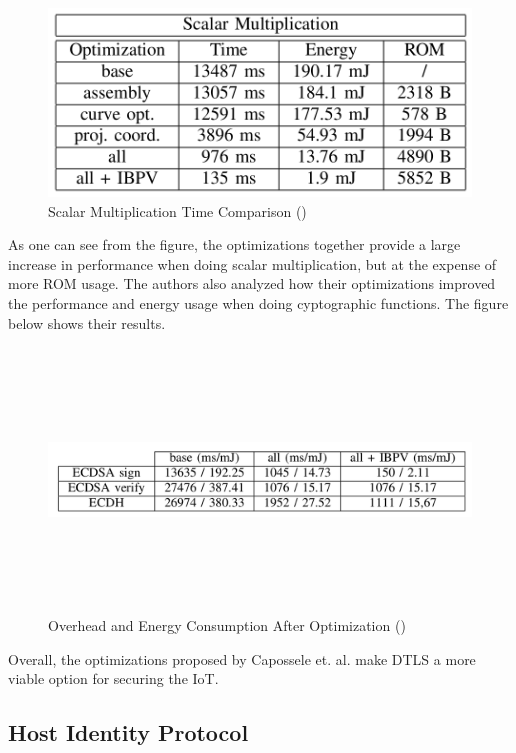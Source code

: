 \documentclass[letterpaper, 12pt]{article}
\begin{document}
\begin{flushleft}
\begin{figure}[H]
	\includegraphics[width=\linewidth,height=5cm,keepaspectratio]{figure6.png}
	\caption{Scalar Multiplication Time Comparison (\cite{Capossele})}
	\label{fig:arch}
\end{figure}

As one can see from the figure, the optimizations together provide a large increase in performance when doing scalar multiplication, but at the expense of more ROM usage. 
The authors also analyzed how their optimizations improved the performance and energy usage when doing cyptographic functions. The figure below
shows their results. 

\begin{figure}[H]
	\includegraphics[width=\linewidth,height=7cm,keepaspectratio]{figure5.png}
	\caption{Overhead and Energy Consumption After Optimization (\cite{Capossele})}
	\label{fig:arch}
\end{figure}

Overall, the optimizations proposed by Capossele et. al. make DTLS a more viable option for securing the IoT.

\subsection*{Host Identity Protocol}


\end{flushleft}
\end{document}
